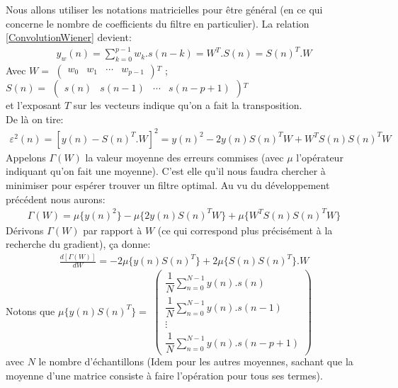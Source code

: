 Nous allons utiliser les notations matricielles pour être général (en ce qui concerne le nombre de coefficients du filtre en particulier). La relation \ref{ConvolutionWiener} devient:
\begin{eqnarray}
y_{w}(n) = \sum_{k=0}^{p-1}w_{k}.s(n-k) = W^{T}.S(n) =S(n)^{T}.W 
\end{eqnarray}
Avec $ W = $
\(
\begin{pmatrix}
w_{0} & w_{1} & \cdots & w_{p-1}
\end{pmatrix}
\)$ ^{T} $
;\\
$ S(n) = $
\(
\begin{pmatrix}
s(n) & s(n-1) & \cdots & s(n-p+1)
\end{pmatrix}
\)$ ^{T} $\\
et l'exposant $ T $ sur les vecteurs indique qu'on a fait la transposition.\\
De là on tire:
\begin{eqnarray}
\varepsilon^{2}(n) = [y(n)-S(n)^{T}.W]^{2} = y(n)^{2}-2y(n)S(n)^{T}W + W^{T}S(n)S(n)^{T}W
\end{eqnarray}
Appelons $ \Gamma(W) $ la valeur moyenne des erreurs commises (avec $ \mu $ l'opérateur indiquant qu'on fait une moyenne). C'est elle qu'il nous faudra chercher à minimiser pour espérer trouver un filtre optimal. Au vu du développement précédent nous aurons:
\begin{eqnarray}\label{FonctionCoût}
\Gamma (W) = \mu \{y(n)^{2}\} - \mu \{2y(n)S(n)^{T}W\} + \mu \{W^{T}S(n)S(n)^{T}W\}
\end{eqnarray}
Dérivons $ \Gamma(W) $ par rapport à $ W $ (ce qui correspond plus précisément à la recherche du gradient), ça donne:
\begin{eqnarray}\label{BrouillonHopf}
\frac{d[\Gamma (W)]}{dW} = - 2\mu \{y(n)S(n)^{T}\} + 2\mu \{S(n)S(n)^{T}\}.W
\end{eqnarray}
Notons que   $ \mu \{y(n)S(n)^{T}\} = $  
\(
\begin{pmatrix}
\dfrac{1}{N} \sum_{n=0}^{N-1}y(n).s(n) \\
\dfrac{1}{N} \sum_{n=0}^{N-1}y(n).s(n-1)\\
\vdots \\
\dfrac{1}{N} \sum_{n=0}^{N-1}y(n).s(n-p+1)
\end{pmatrix}
\)\\
avec $ N $ le nombre d'échantillons (Idem pour les autres moyennes, sachant que la moyenne d'une matrice consiste à faire l'opération pour tous ses termes).\\

